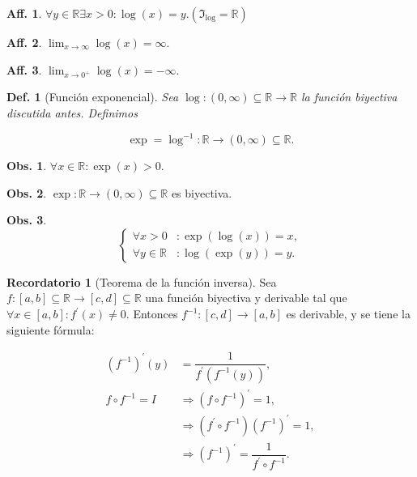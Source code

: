 \documentclass{article}
\theoremstyle{definicion}
\newtheorem{definicion}{Def.}
\theoremstyle{definition}             %
\theoremstyle{definition}             %
\theoremstyle{definition}
\newtheorem{record}{Recordatorio}
\theoremstyle{definition}
\theoremstyle{observacion}
\newtheorem{obs}{Obs.}
\theoremstyle{definition}
\theoremstyle{plain}
\theoremstyle{definition}
\theoremstyle{afirmacion}
\newtheorem{aff}{Aff.}
\theoremstyle{definition}
\begin{document}
    \begin{aff}
        \(\forall y \in \mathbb{R} \exists x > 0 \colon  \log(x) = y. (\Im_{\log} = \mathbb{R})\)
    \end{aff}

    \begin{aff}
        \(\lim_{x\to\infty} \log(x) = \infty.\)
    \end{aff}

    \begin{aff}
        \(\lim_{x \to 0^{+}}\log(x) = -\infty.\)
    \end{aff}

    \begin{definicion}[Función exponencial]
        Sea \(\log \colon (0, \infty) \subseteq \mathbb{R} \to \mathbb{R}\) la función biyectiva discutida antes. Definimos 

        \begin{equation*}
            \exp = \log^{-1} \colon \mathbb{R} \to (0,\infty) \subseteq \mathbb{R}.
        \end{equation*}
    \end{definicion}

    \begin{obs}
        \(\forall x\in\mathbb{R} \colon \exp(x) > 0.\)
    \end{obs}

    \begin{obs}
        \(\exp \colon \mathbb{R} \to (0,\infty) \subseteq \mathbb{R}\) es biyectiva.    
    \end{obs}

    \begin{obs}
        \vphantom{fdasjfldjfksadjflksafafaklsjfa}
        \begin{equation*}
            \begin{cases}
                \forall x > 0 &\colon \exp(\log(x)) = x,\\
                \forall y \in \mathbb{R} &\colon \log(\exp(y)) = y.
            \end{cases}
        \end{equation*}
    \end{obs}

    \begin{record}[Teorema de la función inversa]
        Sea \(f \colon [a,b]\subseteq \mathbb{R} \to [c,d]\subseteq \mathbb{R}\) una función biyectiva y derivable tal que \(\forall x\in[a,b] \colon f^{\prime}(x) \neq 0\). Entonces \(f^{-1} \colon [c,d] \to [a,b]\) es derivable, y se tiene la siguiente fórmula:

        \begin{align*}
            (f^{-1})^{\prime}(y) &= \dfrac{1}{f^{\prime}(f^{-1}(y))},\\
            f \circ f^{-1} = I &\Rightarrow (f \circ f^{-1})^{\prime} = 1,\\
            &\Rightarrow (f^{\prime} \circ f^{-1})(f^{-1})^{\prime} = 1,\\
            &\Rightarrow (f^{-1})^{\prime} = \dfrac{1}{f^{\prime} \circ f^{-1}}.
        \end{align*}
    \end{record}
\end{document}
